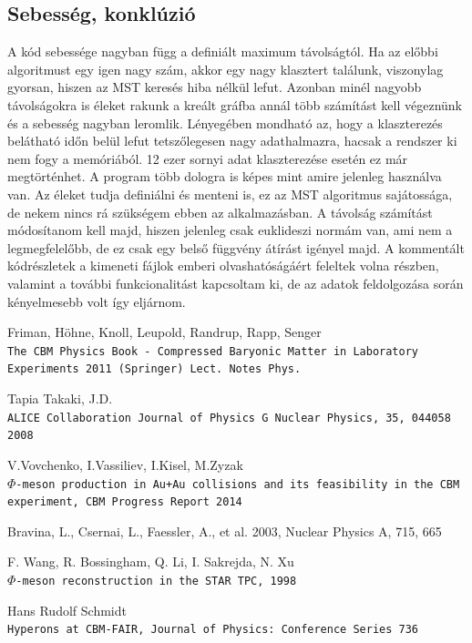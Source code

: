 \documentclass[a4paper,12pt]{article}
\begin{document}
\subsection{ Sebesség, konklúzió}
\par A kód sebessége nagyban függ a definiált maximum távolságtól. Ha az előbbi algoritmust egy igen nagy szám,
akkor egy nagy klasztert találunk, viszonylag gyorsan, hiszen az MST keresés hiba nélkül lefut. Azonban minél nagyobb távolságokra is
éleket rakunk a kreált gráfba annál több számítást kell végeznünk és a sebesség nagyban leromlik. Lényegében mondható az, hogy a
klaszterezés belátható időn belül lefut tetszőlegesen nagy adathalmazra, hacsak a rendszer ki nem fogy a memóriából. 12 ezer sornyi adat 
klaszterezése esetén ez már megtörténhet. A program több dologra is képes mint amire jelenleg használva van. Az éleket tudja definiálni és
menteni is, ez az MST algoritmus sajátossága, de nekem nincs rá szükségem ebben az alkalmazásban. A távolság számítást módosítanom kell majd,
hiszen jelenleg csak euklideszi normám van, ami nem a legmegfelelőbb, de ez csak egy belső függvény átírást igényel majd. A kommentált kódrészletek 
a kimeneti fájlok emberi olvashatóságáért feleltek volna részben, valamint a további funkcionalitást kapcsoltam ki, de az adatok feldolgozása során
 kényelmesebb volt így eljárnom.
\begin{thebibliography}{9}
	Friman, Höhne, Knoll, Leupold, Randrup, Rapp, Senger
	\\\texttt{The CBM Physics Book - Compressed Baryonic Matter in Laboratory Experiments 2011 (Springer) Lect. Notes Phys.}
				
	 Tapia Takaki, J.D.
	 \\\texttt{ALICE Collaboration Journal of Physics G Nuclear Physics, 35, 044058 2008}
				
	 V.Vovchenko, I.Vassiliev, I.Kisel, M.Zyzak
	 \\\texttt{$\Phi$-meson production in Au+Au collisions and its feasibility in the CBM experiment, CBM Progress Report 2014}
				
	Bravina, L., Csernai, L., Faessler, A., et al. 2003, Nuclear Physics A, 715, 665 
				
	F. Wang, R. Bossingham, Q. Li, I. Sakrejda,  N. Xu 
	\\\texttt{$\Phi$-meson reconstruction in the STAR TPC, 1998}
				
	Hans Rudolf Schmidt
	\\\texttt{Hyperons at CBM-FAIR, Journal of Physics: Conference Series 736}
\end{thebibliography}
\end{document}
